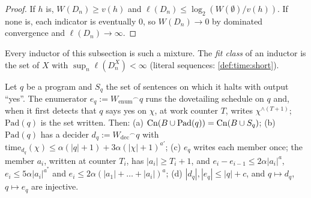 \begin{proof}
If $h$ is, $W(D_n)\ge v(h)$ and $\ell(D_n)\le\log_2(W(\emptyset)/v(h))$. If none is, each indicator is eventually $0$, so $W(D_n)\to0$ by dominated convergence and $\ell(D_n)\to\infty$.
\end{proof}

\noindent Every inductor of this subsection is such a mixture. The \emph{fit class} of an inductor is the set of $X$ with $\sup_n\ell(D^X_n)<\infty$ (literal sequences: \cref{def:time:short}).

\begin{lemma}\label{lem:time:padded}
Let $q$ be a program and $S_q$ the set of sentences on which it halts with output ``yes''. The enumerator $e_q:=W_{\mathrm{enum}}{}^\frown q$ runs the dovetailing schedule on $q$ and, when it first detects that $q$ says yes on $\chi$, at work counter $T$, writes $\chi^{\wedge(T+1)}$; $\mathrm{Pad}(q)$ is the set written. Then:
(a) $\mathrm{Cn}(B\cup\mathrm{Pad}(q))=\mathrm{Cn}(B\cup S_q)$;
(b) $\mathrm{Pad}(q)$ has a decider $d_q:=W_{\mathrm{dec}}{}^\frown q$ with $\mathrm{time}_{d_q}(\chi)\le\alpha(|q|+1)+3\alpha(|\chi|+1)^{a'}$;
(c) $e_q$ writes each member once; the member $a_i$, written at counter $T_i$, has $|a_i|\ge T_i+1$, and $e_i-e_{i-1}\le2\alpha|a_i|^a$, $e_i\le5\alpha|a_i|^{a^*}$ and $e_i\le2\alpha(|a_1|+\dots+|a_i|)^a$;
(d) $|d_q|,|e_q|\le|q|+c$, and $q\mapsto d_q$, $q\mapsto e_q$ are injective.
\end{lemma}

